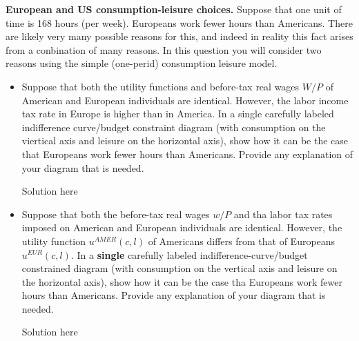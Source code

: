 \documentclass[11pt]{SelfArxOneColBMN}
\begin{document}
\begin{exercise}
	\textbf{European and US consumption-leisure choices.} Suppose that one unit of time is 168 hours (per week). Europeans work fewer hours than Americans. There are likely very many possible reasons for this, and indeed in reality this fact arises from a conbination of many reasons. In this question you will consider two reasons using the simple (one-perid) consumption leisure model.
	\begin{itemize}
		\item Suppose that both the utility functions and before-tax real wages $W / P$ of American and European individuals are identical. However, the labor income tax rate in Europe is higher than in America. In a single carefully labeled indifference curve/budget constraint diagram (with consumption on the viertical axis and leisure on the horizontal axis), show how it can be the case that Europeans work fewer hours than Americans. Provide any explanation of your diagram that is needed.
		\begin{solution}
		Solution here
		\end{solution}
		\item Suppose that both the before-tax real wages $w / P$ and tha labor tax rates imposed on American and European individuals are identical. However, the utility function $u^{AMER}(c,l)$ of Americans differs from that of Europeans $u^{EUR}(c,l)$. In a \textbf{single} carefully labeled indifference-curve/budget constrained diagram (with consumption on the vertical axis and leisure on the horizontal axis), show how it can be the case tha Europeans work fewer hours than Americans. Provide any explanation of your diagram that is needed. 
		\begin{solution}
			Solution here
		\end{solution}
	\end{itemize}
\end{exercise}
\end{document}

